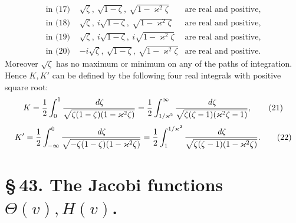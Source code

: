 \documentclass[11pt]{article}
\providecommand{\dd}{\,d}
\begin{document}
\[
\begin{array}{rcl}
\text{in (17) } & \sqrt\zeta,\ \sqrt{1-\zeta},\ \sqrt{1-\varkappa^2\zeta} & \text{are real and positive},\\
\text{in (18) } & \sqrt\zeta,\ i\sqrt{1-\zeta},\ \sqrt{1-\varkappa^2\zeta} & \text{are real and positive},\\
\text{in (19) } & \sqrt\zeta,\ i\sqrt{1-\zeta},\ i\sqrt{1-\varkappa^2\zeta} & \text{are real and positive},\\
\text{in (20) } & -i\sqrt\zeta,\ \sqrt{1-\zeta},\ \sqrt{1-\varkappa^2\zeta} & \text{are real and positive}.
\end{array}
\]
Moreover $\sqrt\zeta$ has no maximum or minimum on any of the paths of integration. Hence $K,K'$ can be defined by the following four real integrals with positive square root:
\begin{equation}
K={1\over2}\int_0^1 {\dd\zeta\over\sqrt{\zeta(1-\zeta)(1-\varkappa^2\zeta)}}
={1\over2}\int_{1/\varkappa^2}^{\infty}{\dd\zeta\over\sqrt{\zeta(\zeta-1)(\varkappa^2\zeta-1)}},
\tag{21}
\end{equation}
\begin{equation}
K'={1\over2}\int_{-\infty}^{0}{\dd\zeta\over\sqrt{-\zeta(1-\zeta)(1-\varkappa^2\zeta)}}
={1\over2}\int_1^{1/\varkappa^2}{\dd\zeta\over\sqrt{\zeta(\zeta-1)(1-\varkappa^2\zeta)}}.
\tag{22}
\end{equation}

\section*{\S\,43. The Jacobi functions $\Theta(v),H(v)$.}
\end{document}
